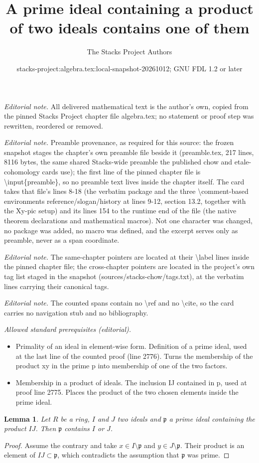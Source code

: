 \documentclass[10pt,a4paper]{amsart}
\title{A prime ideal containing a product of two ideals contains one of them}
\author{The Stacks Project Authors}
\date{stacks-project:algebra.tex:local-snapshot-20261012; GNU FDL 1.2 or later}
\theoremstyle{plain}
\newtheorem{lemma}[subsection]{Lemma}
\theoremstyle{definition}
\theoremstyle{remark}
\numberwithin{equation}{subsection}
\begin{document}
\maketitle
\noindent\textit{Editorial note.} All delivered mathematical text is the author's own, copied from the pinned Stacks Project chapter file algebra.tex; no statement or proof step was rewritten, reordered or removed.\par\medskip
\noindent\textit{Editorial note.} Preamble provenance, as required for this source: the frozen snapshot stages the chapter's own preamble file beside it (preamble.tex, 217 lines, 8116 bytes, the same shared Stacks-wide preamble the published chow and etale-cohomology cards use); the first line of the pinned chapter file is \textbackslash{}input\{preamble\}, so no preamble text lives inside the chapter itself. The card takes that file's lines 8-18 (the verbatim package and the three \textbackslash{}comment-based environments reference/slogan/history at lines 9-12, section 13.2, together with the Xy-pic setup) and its lines 154 to the runtime end of the file (the native theorem declarations and mathematical macros). Not one character was changed, no package was added, no macro was defined, and the excerpt serves only as preamble, never as a span coordinate.\par\medskip
\noindent\textit{Editorial note.} The same-chapter pointers are located at their \textbackslash{}label lines inside the pinned chapter file; the cross-chapter pointers are located in the project's own tag list staged in the snapshot (sources/stacks-chow/tags.txt), at the verbatim lines carrying their canonical tags.\par\medskip
\noindent\textit{Editorial note.} The counted spans contain no \textbackslash{}ref and no \textbackslash{}cite, so the card carries no navigation stub and no bibliography.\par\medskip
\noindent\textit{Allowed standard prerequisites (editorial).}\begin{itemize}
\item Primality of an ideal in element-wise form. Definition of a prime ideal, used at the last line of the counted proof (line 2776). Turns the membership of the product xy in the prime p into membership of one of the two factors.
\item Membership in a product of ideals. The inclusion IJ contained in p, used at proof line 2775. Places the product of the two chosen elements inside the prime ideal.
\end{itemize}\medskip
\begin{lemma}
\label{lemma-product-ideals-in-prime}
Let $R$ be a ring, $I$ and $J$ two ideals and $\mathfrak p$ a prime ideal
containing the product $IJ$. Then $\mathfrak{p}$ contains $I$ or $J$.
\end{lemma}

\begin{proof}
Assume the contrary and take $x \in I \setminus \mathfrak p$ and
$y \in J \setminus \mathfrak p$. Their product is an element of
$IJ \subset \mathfrak p$, which contradicts the assumption that
$\mathfrak p$ was prime.
\end{proof}
\end{document}
